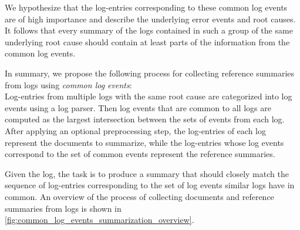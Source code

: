 We hypothesize that the log-entries corresponding to these common log events are of high importance
and describe the underlying error events and root causes.
It follows that every summary of the logs contained in such a group of the same underlying root cause
should contain at least parts of the information from the common log events.

In summary, we propose the following process for collecting reference summaries from logs using \emph{common log events}:\\
Log-entries from multiple logs with the same root cause are categorized into log events using a log parser.
Then log events that are common to all logs are computed as the largest intersection between the sets of events from each log.
After applying an optional preprocessing step, the log-entries of each log represent the documents to summarize,
while the log-entries whose log events correspond to the set of common events represent the reference summaries.

Given the log,
the task is to produce a summary that should closely match the sequence of log-entries
corresponding to the set of log events similar logs have in common.
An overview of the process of collecting documents and reference summaries from logs is shown in \autoref{fig:common_log_events_summarization_overview}.

